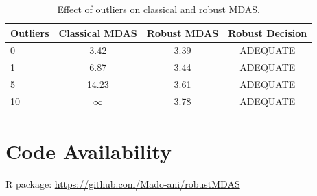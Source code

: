 \documentclass[10pt,a4paper]{article}
\begin{document}
\begin{table}[h]
\centering
\caption{Effect of outliers on classical and robust MDAS.}
\begin{tabular}{lccc}
\toprule
Outliers & Classical MDAS & Robust MDAS & Robust Decision \\
\midrule
0 & 3.42 & 3.39 & ADEQUATE \\
1 & 6.87 & 3.44 & ADEQUATE \\
5 & 14.23 & 3.61 & ADEQUATE \\
10 & $\infty$ & 3.78 & ADEQUATE \\
\bottomrule
\end{tabular}
\end{table}

\section{Code Availability}

R package: \url{https://github.com/Mado-ani/robustMDAS}
\end{document}
